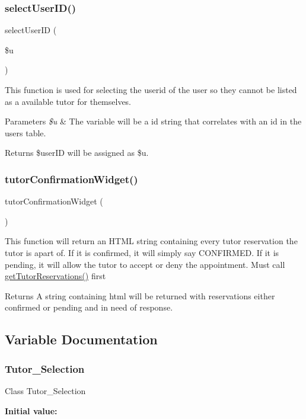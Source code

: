 \subsubsection{\texorpdfstring{selectUserID()}{selectUserID()}}
{\footnotesize\ttfamily select\+User\+ID (\begin{DoxyParamCaption}\item[{}]{\$u }\end{DoxyParamCaption})}

This function is used for selecting the userid of the user so they cannot be listed as a available tutor for themselves. 
\begin{DoxyParams}{Parameters}
{\em \$u} & The variable will be a id string that correlates with an id in the users table. \\
\hline
\end{DoxyParams}
\begin{DoxyReturn}{Returns}
\$user\+ID will be assigned as \$u. 
\end{DoxyReturn}
\mbox{\label{_tutor___selection_8class_8php_ac3d759ab05a37faccd599d582b1eccda}} 
\subsubsection{\texorpdfstring{tutorConfirmationWidget()}{tutorConfirmationWidget()}}
{\footnotesize\ttfamily tutor\+Confirmation\+Widget (\begin{DoxyParamCaption}{ }\end{DoxyParamCaption})}

This function will return an H\+T\+ML string containing every tutor reservation the tutor is apart of. If it is confirmed, it will simply say C\+O\+N\+F\+I\+R\+M\+ED. If it is pending, it will allow the tutor to accept or deny the appointment. Must call \mbox{\hyperlink{_tutor___selection_8class_8php_a8297068ed77f57ec6bd722bdffda73b4}{get\+Tutor\+Reservations()}} first \begin{DoxyReturn}{Returns}
A string containing html will be returned with reservations either confirmed or pending and in need of response. 
\end{DoxyReturn}


\subsection{Variable Documentation}
\mbox{\label{_tutor___selection_8class_8php_ae781e26d5acd9bf768dc9600a970f35e}} 
\subsubsection{\texorpdfstring{Tutor\_Selection}{Tutor\_Selection}}
{\footnotesize\ttfamily Class Tutor\+\_\+\+Selection}

{\bfseries Initial value\+:}
\begin{DoxyCode}{0}
\DoxyCodeLine{\{}

\end{DoxyCode}
